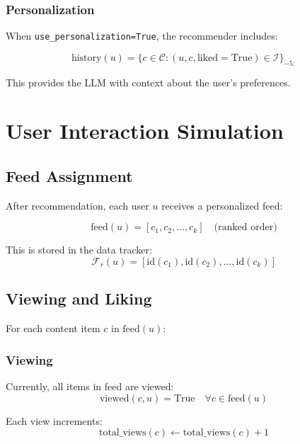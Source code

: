 \documentclass[11pt]{article}
\begin{document}
\subsubsection{Personalization}

When \texttt{use\_personalization=True}, the recommender includes:

\begin{equation}
\text{history}(u) = \{c \in \mathcal{C} : (u, c, \text{liked}=\text{True}) \in \mathcal{I}\}_{-5:}
\end{equation}

This provides the LLM with context about the user's preferences.

\section{User Interaction Simulation}

\subsection{Feed Assignment}

After recommendation, each user $u$ receives a personalized feed:

\begin{equation}
\text{feed}(u) = [c_1, c_2, \ldots, c_k] \quad \text{(ranked order)}
\end{equation}

This is stored in the data tracker:
\begin{equation}
\mathcal{F}_r(u) = [\text{id}(c_1), \text{id}(c_2), \ldots, \text{id}(c_k)]
\end{equation}

\subsection{Viewing and Liking}

For each content item $c$ in $\text{feed}(u)$:

\subsubsection{Viewing}
Currently, all items in feed are viewed:
\begin{equation}
\text{viewed}(c, u) = \text{True} \quad \forall c \in \text{feed}(u)
\end{equation}

Each view increments:
\begin{equation}
\text{total\_views}(c) \leftarrow \text{total\_views}(c) + 1
\end{equation}
\end{document}
